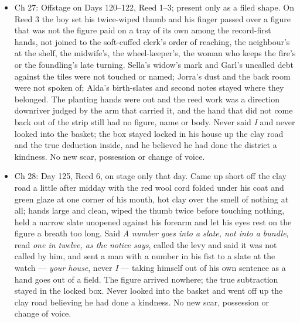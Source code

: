 \documentclass{design/chronicle}
\begin{document}
{\begin{itemize}[leftmargin=1.4em,itemsep=1pt,topsep=3pt,parsep=0pt]
\end{itemize}

\begin{itemize}[leftmargin=1.4em,itemsep=1pt,topsep=3pt,parsep=0pt]

\item Ch 27: Offstage on Days 120–122, Reed 1–3; present only as a filed shape. On Reed 3 the boy set his twice-wiped thumb and his finger passed over a figure that was not the figure paid on a tray of its own among the record-first hands, not joined to the soft-cuffed clerk’s order of reaching, the neighbour’s at the shelf, the midwife’s, the wheel-keeper’s, the woman who keeps the fire’s or the foundling’s late turning. Sella’s widow’s mark and Garl’s uncalled debt against the tiles were not touched or named; Jorra’s dust and the back room were not spoken of; Alda’s birth-slates and second notes stayed where they belonged. The planting hands were out and the reed work was a direction downriver judged by the arm that carried it, and the hand that did not come back out of the strip still had no figure, name or body. Never said \emph{I} and never looked into the basket; the box stayed locked in his house up the clay road and the true deduction inside, and he believed he had done the district a kindness. No new scar, possession or change of voice.

\end{itemize}

\begin{itemize}[leftmargin=1.4em,itemsep=1pt,topsep=3pt,parsep=0pt]

\item Ch 28: Day 125, Reed 6, on stage only that day. Came up short off the clay road a little after midday with the red wool cord folded under his coat and green glaze at one corner of his mouth, hot clay over the smell of nothing at all; hands large and clean, wiped the thumb twice before touching nothing, held a narrow slate unopened against his forearm and let his eyes rest on the figure a breath too long. Said \emph{A number goes into a slate, not into a bundle}, read \emph{one in twelve, as the notice says}, called the levy and said it was not called by him, and sent a man with a number in his fist to a slate at the watch — \emph{your house}, never \emph{I} — taking himself out of his own sentence as a hand goes out of a field. The figure arrived nowhere; the true subtraction stayed in the locked box. Never looked into the basket and went off up the clay road believing he had done a kindness. No new scar, possession or change of voice.


\end{itemize}}
\end{document}
